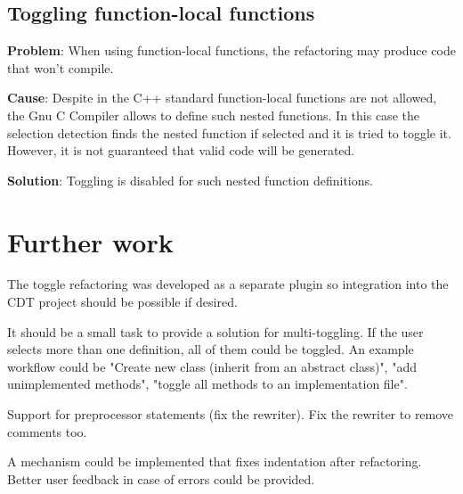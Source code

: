 \subsection{Toggling function-local functions}
\textbf{Problem}: When using function-local functions, the refactoring may 
produce code that won't compile.

\textbf{Cause}: Despite in the C++ standard\cite{IsoCpp} function-local 
functions are not allowed, the Gnu C Compiler allows to define such nested 
functions\cite{GCC}. In this case the selection detection finds the nested 
function if selected and it is tried to toggle it. However, it is not guaranteed 
that valid code will be generated.

\textbf{Solution}: Toggling is disabled for such nested function definitions.


\section{Further work}

The toggle refactoring was developed as a separate plugin so integration into 
the CDT project should be possible if desired.

It should be a small task to provide a solution for multi-toggling. If the user 
selects more than one definition, all of them could be toggled. An example 
workflow could be "Create new class (inherit from an abstract class)", "add 
unimplemented methods", "toggle all methods to an implementation file".

Support for preprocessor statements (fix the rewriter). Fix the rewriter to 
remove comments too.

A mechanism could be implemented that fixes indentation after refactoring.
Better user feedback in case of errors could be provided.


